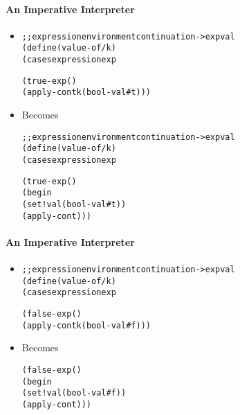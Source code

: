 \documentclass{beamer}
\begin{document}
\begin{frame}[fragile]
\framesubtitle{An Imperative Interpreter}
\begin{scriptsize}
\begin{itemize}
\item<1->
\begin{alltt}
;; expression environment continuation -> expval
(define (value-of/k)
  (cases expression exp

    (true-exp ()
              (apply-cont k (bool-val #t)))
\end{alltt}

\item<1-> Becomes
\begin{alltt}
;; expression environment continuation -> expval
(define (value-of/k)
  (cases expression exp

    (true-exp ()
              (begin
                (set! val (bool-val #t))
                (apply-cont)))
\end{alltt}

\end{itemize}
\end{scriptsize}
\end{frame}

\begin{frame}[fragile]
\framesubtitle{An Imperative Interpreter}
\begin{scriptsize}
\begin{itemize}
\item<1->
\begin{alltt}
;; expression environment continuation -> expval
(define (value-of/k)
  (cases expression exp

    (false-exp ()
               (apply-cont k (bool-val #f)))
\end{alltt}

\item<1-> Becomes
\begin{alltt}
    (false-exp ()
               (begin
                 (set! val (bool-val #f))
                 (apply-cont)))
\end{alltt}

\end{itemize}
\end{scriptsize}
\end{frame}
\end{document}
